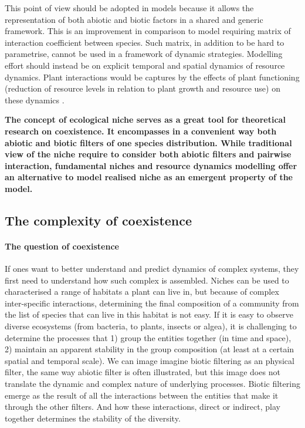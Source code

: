 This point of view should be adopted in models \parencite{berger_competition_2008} because it allows the representation of both abiotic and biotic factors in a shared and generic framework. This is an improvement in comparison to model requiring matrix of interaction coefficient between species. Such matrix, in addition to be hard to parametrise, cannot be used in a framework of dynamic strategies. Modelling effort should instead be on explicit temporal and spatial dynamics of resource dynamics. Plant interactions would be captures by the effects of plant functioning (reduction of resource levels in relation to plant growth and resource use) on these dynamics \parencite{berger_competition_2008, morin_comparing_2009}.


\textbf{The concept of ecological niche serves as a great tool for theoretical research on coexistence. It encompasses in a convenient way both abiotic and biotic filters of one species distribution. While traditional view of the niche require to consider both abiotic filters and pairwise interaction, fundamental niches and resource dynamics modelling offer an alternative to model realised niche as an emergent property of the model.}


\subsection{The complexity of coexistence}

\paragraph{The question of coexistence}
If ones want to better understand and predict dynamics of complex systems, they first need to understand how such complex is assembled. Niches can be used to characterised a range of habitats a plant can live in, but because of complex inter-specific interactions, determining the final composition of a community from the list of species that can live in this habitat is not easy. If it is easy to observe diverse ecosystems (from bacteria, to plants, insects or algea), it is challenging to determine the processes that 1) group the entities together (in time and space), 2) maintain an apparent stability in the group composition (at least at a certain spatial and temporal scale). 
We can image imagine biotic filtering as an physical filter, the same way abiotic filter is often illustrated, but this image does not translate the dynamic and complex nature of underlying processes. Biotic filtering emerge as the result of all the interactions between the entities that make it through the other filters. And how these interactions, direct or indirect, play together determines the stability of the diversity.\\

